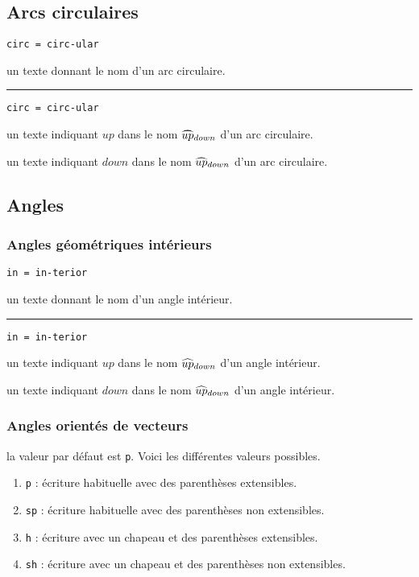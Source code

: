 \documentclass[12pt,a4paper]{article}
\theoremstyle{definition}
\newcommand\separation{
	\medskip
	\hfill\rule{0.5\textwidth}{0.75pt}\hfill
	\medskip
}
\newcommand\mwhyprefix[2]{%
	\texttt{#1 = #1-#2}%
}
\begin{document}
\subsection{Arcs circulaires}



 \hfill \mwhyprefix{circ}{ular}

\IDarg{} un texte donnant le nom d'un arc circulaire.


\separation


 \hfill \mwhyprefix{circ}{ular}

 un texte indiquant $up$ dans le nom $\circarc*{up}{down}$ d'un arc circulaire.

 un texte indiquant $down$ dans le nom $\circarc*{up}{down}$ d'un arc circulaire.


\subsection{Angles}

\subsubsection{Angles géométriques \og intérieurs \fg}



 \hfill \mwhyprefix{in}{terior}

\IDarg{} un texte donnant le nom d'un angle intérieur.


\separation


 \hfill \mwhyprefix{in}{terior}

 un texte indiquant $up$ dans le nom $\anglein*{up}{down}$ d'un angle intérieur.

 un texte indiquant $down$ dans le nom $\anglein*{up}{down}$ d'un angle intérieur.


\subsubsection{Angles orientés de vecteurs}




\IDoption{} la valeur par défaut est \verb+p+.  Voici les différentes valeurs possibles.
\begin{enumerate}
	\item \verb+p+ : écriture habituelle avec des parenthèses extensibles.

	\item \verb+sp+ : écriture habituelle avec des parenthèses non extensibles.

	\item \verb+h+ : écriture avec un chapeau et des parenthèses extensibles.

	\item \verb+sh+ : écriture avec un chapeau et des parenthèses non extensibles.
\end{enumerate}
\end{document}
